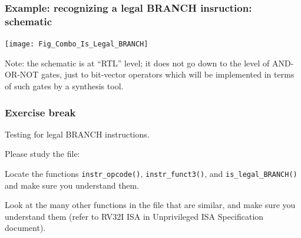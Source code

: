 
\begin{frame}[fragile]
\frametitle{Example: recognizing a legal BRANCH insruction: schematic}

\footnotesize

\begin{center}
 \texttt{[image: Fig\_Combo\_Is\_Legal\_BRANCH]}
\end{center}

\vfill

Note: the schematic is at ``RTL'' level; it does not go down to the
level of AND-OR-NOT gates, just to bit-vector operators which will be
implemented in terms of such gates by a synthesis tool.

\end{frame}


\begin{frame}[fragile]
\frametitle{\EmojiExercise \hmm Exercise break}

\footnotesize

Testing for legal BRANCH instructions.

\vspace{2ex}

Please study the file: 

\vfill

Locate the functions \verb|instr_opcode()|, \verb|instr_funct3()|, and
\verb|is_legal_BRANCH()| and make sure you understand them.

\vfill

Look at the many other functions in the file that are similar, and
make sure you understand them (refer to RV32I ISA in Unprivileged ISA
Specification document).

\end{frame}


